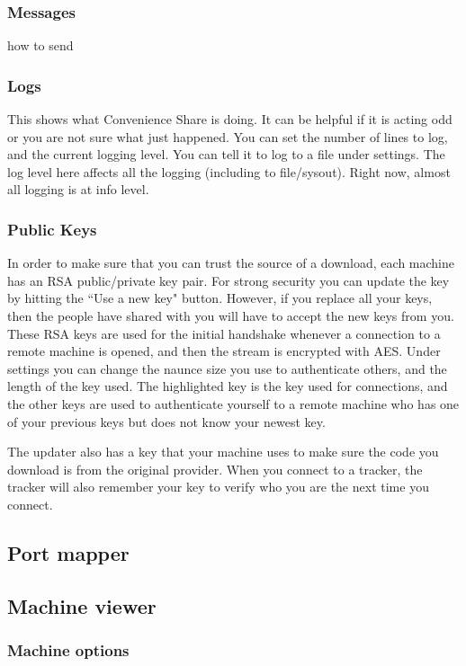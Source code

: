 \documentclass{article}
\begin{document}
\subsubsection{Messages}
how to send


\subsubsection{Logs}
This shows what Convenience Share is doing.
It can be helpful if it is acting odd or you are not sure what just happened.
You can set the number of lines to log, and the current logging level.
You can tell it to log to a file under settings.
The log level here affects all the logging (including to file/sysout).
Right now, almost all logging is at info level.


\subsubsection{Public Keys}
In order to make sure that you can trust the source of a download, each machine has an RSA public/private key pair.
For strong security you can update the key by hitting the ``Use a new key" button.
However, if you replace all your keys, then the people have shared with you will have to accept the new keys from you.
These RSA keys are used for the initial handshake whenever a connection to a remote machine is opened, and then the stream is encrypted with AES.
Under settings you can change the naunce size you use to authenticate others, and the length of the key used.
The highlighted key is the key used for connections, and the other keys are used to authenticate yourself to a remote machine who has one of your previous keys but does not know your newest key.

The updater also has a key that your machine uses to make sure the code you download is from the original provider.
When you connect to a tracker, the tracker will also remember your key to verify who you are the next time you connect.

\subsection{Port mapper}
\subsection{Machine viewer}
\subsubsection{Machine options}
\end{document}
